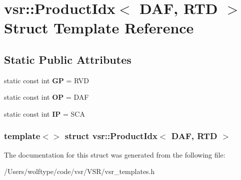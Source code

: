 \hypertarget{structvsr_1_1_product_idx_3_01_d_a_f_00_01_r_t_d_01_4}{\section{vsr\-:\-:Product\-Idx$<$ D\-A\-F, R\-T\-D $>$ Struct Template Reference}
\label{structvsr_1_1_product_idx_3_01_d_a_f_00_01_r_t_d_01_4}
}
\subsection*{Static Public Attributes}
\begin{DoxyCompactItemize}
\item 
\hypertarget{structvsr_1_1_product_idx_3_01_d_a_f_00_01_r_t_d_01_4_a466b112084f545b110a396509b8bb151}{static const int {\bfseries G\-P} = R\-V\-D}\label{structvsr_1_1_product_idx_3_01_d_a_f_00_01_r_t_d_01_4_a466b112084f545b110a396509b8bb151}

\item 
\hypertarget{structvsr_1_1_product_idx_3_01_d_a_f_00_01_r_t_d_01_4_a544ec2228463395ef3ea50a150de99d4}{static const int {\bfseries O\-P} = D\-A\-F}\label{structvsr_1_1_product_idx_3_01_d_a_f_00_01_r_t_d_01_4_a544ec2228463395ef3ea50a150de99d4}

\item 
\hypertarget{structvsr_1_1_product_idx_3_01_d_a_f_00_01_r_t_d_01_4_ab978d7a29a18f5fc7b3e0e964ab462f3}{static const int {\bfseries I\-P} = S\-C\-A}\label{structvsr_1_1_product_idx_3_01_d_a_f_00_01_r_t_d_01_4_ab978d7a29a18f5fc7b3e0e964ab462f3}

\end{DoxyCompactItemize}
\subsubsection*{template$<$$>$ struct vsr\-::\-Product\-Idx$<$ D\-A\-F, R\-T\-D $>$}



The documentation for this struct was generated from the following file\-:\begin{DoxyCompactItemize}
\item 
/\-Users/wolftype/code/vsr/\-V\-S\-R/vsr\-\_\-templates.\-h\end{DoxyCompactItemize}
